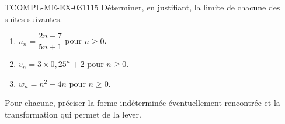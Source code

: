 \begin{exercice}{TCOMPL-ME-EX-031}{1}{15}
Déterminer, en justifiant, la limite de chacune des suites suivantes.
\begin{enumerate}
  \item $u_n = \dfrac{2n-7}{5n+1}$ pour $n \geq 0$.
  \item $v_n = 3\times0{,}25^n + 2$ pour $n \geq 0$.
  \item $w_n = n^2 - 4n$ pour $n \geq 0$.
\end{enumerate}
Pour chacune, préciser la forme indéterminée éventuellement rencontrée et la transformation qui permet de la lever.
\end{exercice}
